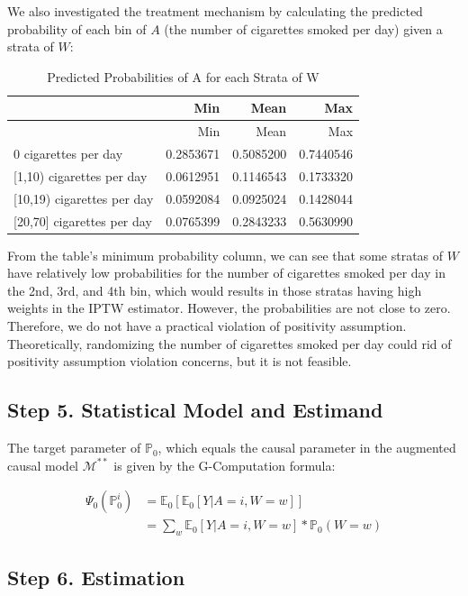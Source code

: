 \documentclass[]{article}
\begin{document}
We also investigated the treatment mechanism by calculating the
predicted probability of each bin of \(A\) (the number of cigarettes
smoked per day) given a strata of \(W\):

\begin{longtable}[]{@{}lrrr@{}}
\caption{Predicted Probabilities of A for each Strata of
W}\tabularnewline
\toprule
& Min & Mean & Max\tabularnewline
\midrule
\endfirsthead
\toprule
& Min & Mean & Max\tabularnewline
\midrule
\endhead
0 cigarettes per day & 0.2853671 & 0.5085200 & 0.7440546\tabularnewline
{[}1,10) cigarettes per day & 0.0612951 & 0.1146543 &
0.1733320\tabularnewline
{[}10,19) cigarettes per day & 0.0592084 & 0.0925024 &
0.1428044\tabularnewline
{[}20,70{]} cigarettes per day & 0.0765399 & 0.2843233 &
0.5630990\tabularnewline
\bottomrule
\end{longtable}

From the table's minimum probability column, we can see that some
stratas of \(W\) have relatively low probabilities for the number of
cigarettes smoked per day in the 2nd, 3rd, and 4th bin, which would
results in those stratas having high weights in the IPTW estimator.
However, the probabilities are not close to zero. Therefore, we do not
have a practical violation of positivity assumption. Theoretically,
randomizing the number of cigarettes smoked per day could rid of
positivity assumption violation concerns, but it is not feasible.

\hypertarget{step-5.-statistical-model-and-estimand}{%
\subsection{Step 5. Statistical Model and
Estimand}\label{step-5.-statistical-model-and-estimand}}

The target parameter of \(\mathbb{P}_0\), which equals the causal
parameter in the augmented causal model \(\mathcal{M}^{**}\) is given by
the G-Computation formula:

\[
\begin{aligned}
\Psi_0(\mathbb{P}^i_0)&=\mathbb{E}_0[\mathbb{E}_0[Y|A= i,W=w]]\\
&= \sum_w\mathbb{E}_0[Y|A=i,W=w]*\mathbb{P}_0(W=w)
\end{aligned}
\]

\hypertarget{step-6.-estimation}{%
\subsection{Step 6. Estimation}\label{step-6.-estimation}}
\end{document}
